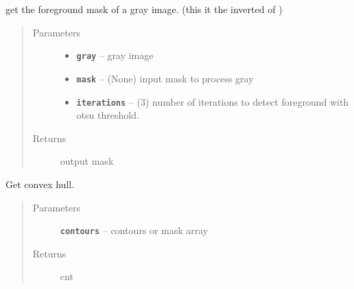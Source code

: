 \documentclass[letterpaper,10pt,english]{sphinxmanual}
\begin{document}

\begin{fulllineitems}
\label{RRtoolbox.lib.arrayops:RRtoolbox.lib.arrayops.mask.foreground}
get the foreground mask of a gray image. (this it the inverted of {\hyperref[RRtoolbox.lib.arrayops:RRtoolbox.lib.arrayops.mask.background]{\emph{}}})
\begin{quote}\begin{description}
\item[{Parameters}] \leavevmode\begin{itemize}
\item {} 
\textbf{\texttt{gray}} -- gray image

\item {} 
\textbf{\texttt{mask}} -- (None) input mask to process gray

\item {} 
\textbf{\texttt{iterations}} -- (3) number of iterations to detect foreground
with otsu threshold.

\end{itemize}

\item[{Returns}] \leavevmode
output mask

\end{description}\end{quote}

\end{fulllineitems}


\begin{fulllineitems}
\label{RRtoolbox.lib.arrayops:RRtoolbox.lib.arrayops.mask.gethull}
Get convex hull.
\begin{quote}\begin{description}
\item[{Parameters}] \leavevmode
\textbf{\texttt{contours}} -- contours or mask array

\item[{Returns}] \leavevmode
cnt

\end{description}\end{quote}

\end{fulllineitems}
\end{document}
